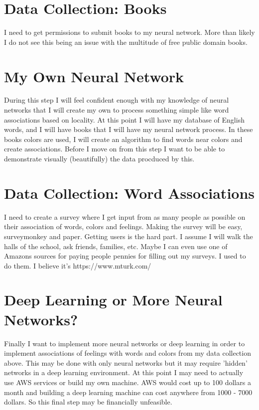 \documentclass{article}
\begin{document}
\section{Data Collection: Books}
I need to get permissions to submit books to my neural network. More than likely I do not see this being an issue with the multitude of free public domain books.

\section{My Own Neural Network}
During this step I will feel confident enough with my knowledge of neural networks that I will create my own to process something simple like word associations based on locality. At this point I will have my database of English words, and I will have books that I will have my neural network process. In these books colors are used, I will create an algorithm to find words near colors and create associations. Before I move on from this step I want to be able to demonstrate visually (beautifully) the data procduced by this.

\section{Data Collection: Word Associations}
I need to create a survey where I get input from as many people as possible on their association of words, colors and feelings. Making the survey will be easy, surveymonkey and paper. Getting users is the hard part. I assume I will walk the halls of the school, ask friends, families, etc. Maybe I can even use one of Amazons sources for paying people pennies for filling out my surveys. I used to do them. I believe it's https://www.mturk.com/

\section{Deep Learning or More Neural Networks?}
Finally I want to implement more neural networks or deep learning in order to implement associations of feelings with words and colors from my data collection above. This may be done with only neural networks but it may require 'hidden' networks in a deep learning environment. At this point I may need to actually use AWS services or build my own machine. AWS would cost up to 100 dollars a month and building a deep learning machine can cost anywhere from 1000 - 7000 dollars. So this final step may be financially unfeasible.
\end{document}
